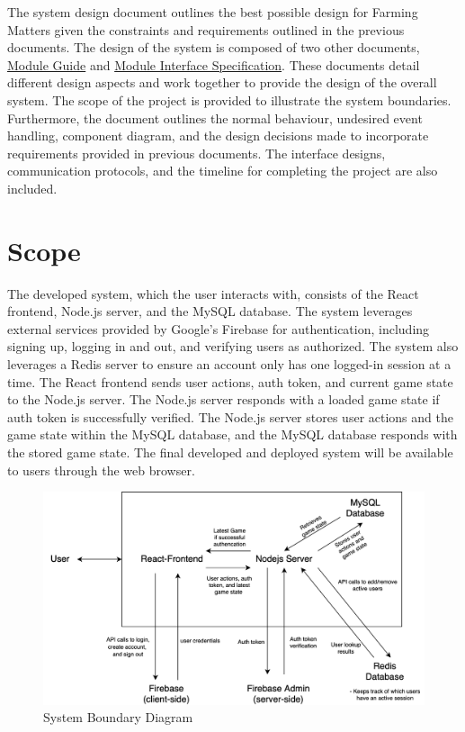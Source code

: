 \documentclass[12pt, titlepage]{article}
\begin{document}
The system design document outlines the best possible design for Farming Matters given the constraints and requirements outlined in the previous documents. The design of the system is composed of two other documents, \href{https://github.com/brandonduong/Farming-Matters/blob/main/docs/Design/MG/MG.pdf}{Module Guide} and \href{https://github.com/brandonduong/Farming-Matters/blob/main/docs/Design/MIS/MIS.pdf}{Module Interface Specification}. These documents detail different design aspects and work together to provide the design of the overall system. The scope of the project is provided to illustrate the system boundaries. Furthermore, the document outlines the normal behaviour, undesired event handling, component diagram, and the design decisions made to incorporate requirements provided in previous documents. The interface designs, communication protocols, and the timeline for completing the project are also included. 


\section{Scope} The developed system, which the user interacts with, consists of the React frontend, Node.js server, and the MySQL database. The system leverages external services provided by Google's Firebase for authentication, including signing up, logging in and out, and verifying users as authorized. The system also leverages a Redis server to ensure an account only has one logged-in session at a time. The React frontend sends user actions, auth token, and current game state to the Node.js server. The Node.js server responds with a loaded game state if auth token is successfully verified. The Node.js server stores user actions and the game state within the MySQL database, and the MySQL database responds with the stored game state. The final developed and deployed system will be available to users through the web browser.
\begin{figure}[H]
\centering
\includegraphics[width=1\textwidth]{SystemBoundary.png}
\caption{System Boundary Diagram}
\label{FigUH}
\end{figure}
\end{document}
